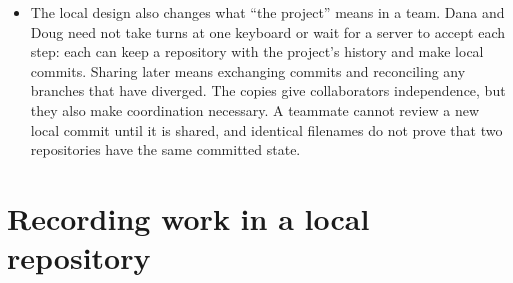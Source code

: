\documentclass[10pt]{article}
\begin{document}
\begin{itemize}[leftmargin=1.25em, itemsep=0.3em, parsep=0pt, topsep=0pt]
    \item The local design also changes what ``the project'' means in a team. Dana and Doug need not take turns at one keyboard or wait for a server to accept each step: each can keep a repository with the project's history and make local commits. Sharing later means exchanging commits and reconciling any branches that have diverged. The copies give collaborators independence, but they also make coordination necessary. A teammate cannot review a new local commit until it is shared, and identical filenames do not prove that two repositories have the same committed state.
\end{itemize}

\section*{Recording work in a local repository}
\end{document}

